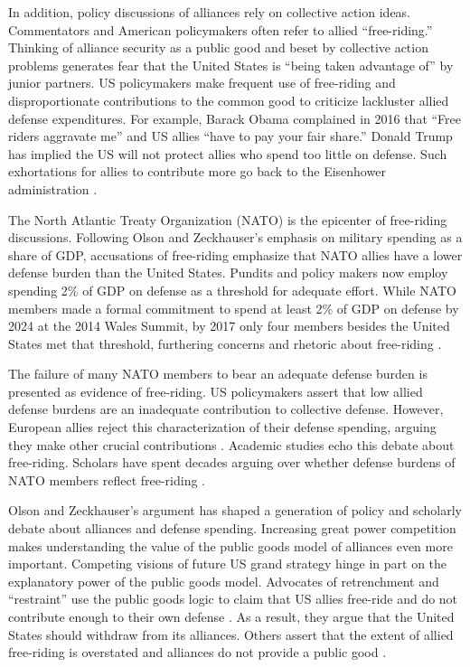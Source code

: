 \documentclass[12pt]{article}
\begin{document}
In addition, policy discussions of alliances rely on collective action ideas.
Commentators and American policymakers often refer to allied ``free-riding.'' 
Thinking of alliance security as a public good and beset by collective action problems generates fear that the United States is ``being taken advantage of'' by junior partners. 
US policymakers make frequent use of free-riding and disproportionate contributions to the common good to criticize lackluster allied defense expenditures.  
For example, Barack Obama complained in 2016 that ``Free riders aggravate me'' and US allies ``have to pay your fair share.'' 
Donald Trump has implied the US will not protect allies who spend too little on defense. 
Such exhortations for allies to contribute more go back to the Eisenhower administration \citep{Lanoszka2015}.


The North Atlantic Treaty Organization (NATO) is the epicenter of free-riding discussions. 
Following Olson and Zeckhauser's emphasis on military spending as a share of GDP, accusations of free-riding emphasize that NATO allies have a lower defense burden than the United States. 
Pundits and policy makers now employ spending 2\% of GDP on defense as a threshold for adequate effort.
While NATO members made a formal commitment to spend at least 2\% of GDP on defense by 2024 at the 2014 Wales Summit, by 2017 only four members besides the United States met that threshold, furthering concerns and rhetoric about free-riding \citep{EconomistNATO2017}. 


The failure of many NATO members to bear an adequate defense burden is presented as evidence of free-riding. 
US policymakers assert that low allied defense burdens are an inadequate contribution to collective defense. 
However, European allies reject this characterization of their defense spending, arguing they make other crucial contributions \citep{Boyer1993}. 
Academic studies echo this debate about free-riding.  
Scholars have spent decades arguing over whether defense burdens of NATO members reflect free-riding \citep{SandlerForbes1980, Palmer1990, GatesTerasawa1992, SandlerHartley2001, Lanoszka2015, PluemperNeumayer2015}.


Olson and Zeckhauser's argument has shaped a generation of policy and scholarly debate about alliances and defense spending. 
Increasing great power competition makes understanding the value of the public goods model of alliances even more important. 
Competing visions of future US grand strategy hinge in part on the explanatory power of the public goods model. 
Advocates of retrenchment and ``restraint'' use the public goods logic to claim that US allies free-ride and do not contribute enough to their own defense \citep{Preble2009, Posen2014}. 
As a result, they argue that the United States should withdraw from its alliances.
Others assert that the extent of allied free-riding is overstated and alliances do not provide a public good \citep{BrandsFeaver2017}. 
\end{document}
